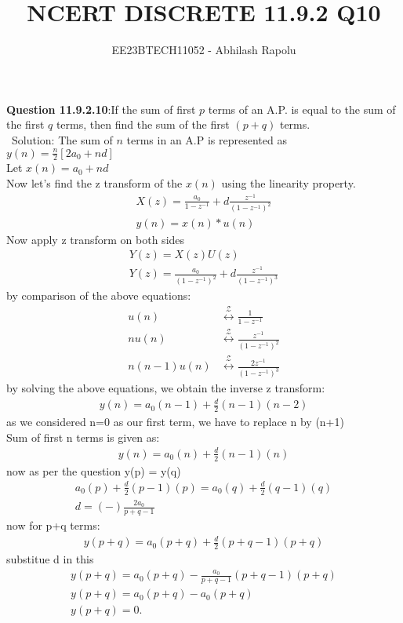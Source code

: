 \documentclass[journal,12pt,twocolumn]{IEEEtran}
\title{NCERT DISCRETE 11.9.2 Q10}
\author{EE23BTECH11052 - Abhilash Rapolu }
\begin{document}
\maketitle
\newpage
\textbf{Question 11.9.2.10}:If the sum of first $p$ terms of an A.P. is equal to the sum of the first $q$ terms, then
find the sum of the first $(p + q)$ terms.\\
\ Solution:
The sum of $n$ terms in an A.P is represented as\\
$ y(n) = \frac {n}{2}[2a_0+nd] $\\
Let $x(n)=a_0+nd$\\
Now let's find the z transform of the $x(n)$ using the linearity property.\\
\begin{align}
X(z)=\frac{a_0}{1-z^{-1}}+d\frac{z^{-1}}{(1-z^{-1})^2}\\
y(n) = x(n)*u(n)
\end{align}
Now apply z transform on both sides\\
\begin{align}
Y(z)=X(z)U(z)\\
Y(z)=\frac{a_0}{(1-z^{-1})^2}+d\frac{z^{-1}}{(1-z^{-1})^3}
\end{align}
by comparison of the above equations:\\
\begin{align}
u(n) &\stackrel{\mathcal{Z}}{\longleftrightarrow} \frac{1}{1-z^{-1}}\\
nu(n) &\stackrel{\mathcal{Z}}{\longleftrightarrow} \frac{z^{-1}}{(1-z^{-1})^2} \\
n(n-1)u(n) &\stackrel{\mathcal{Z}}{\longleftrightarrow} \frac{2z^{-1}}{(1-z^{-1})^3} 
\end{align}
by solving the above equations, we obtain the inverse z transform:\\
\begin{align}
y(n)=a_0(n-1)+\frac{d}{2}(n-1)(n-2)
\end{align}
as we considered n=0 as our first term, we have to replace n by (n+1)\\
Sum of first n terms is given as:\\
\begin{align}
y(n)=a_0(n)+\frac{d}{2}(n-1)(n)
\end{align}
now as per the question y(p) = y(q)\\
\begin{align}
a_0(p)+\frac{d}{2}(p-1)(p)=a_0(q)+\frac{d}{2}(q-1)(q)\\
d=(-)\frac{2a_0}{p+q-1}
\end{align}
now for p+q terms:\\
\begin{align}
y(p+q)=a_0(p+q)+\frac{d}{2}(p+q-1)(p+q)
\end{align}
substitue d in this\\
\begin{align}
y(p+q)=a_0(p+q)-\frac{a_0}{p+q-1}(p+q-1)(p+q)\\
y(p+q)=a_0(p+q)-a_0(p+q)\\
y(p+q)=0.
\end{align}
\end{document}
